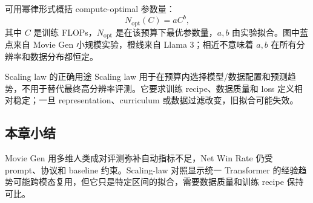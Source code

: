 
可用幂律形式概括 compute-optimal 参数量：
\[
N_{\mathrm{opt}}(C)=aC^b,
\]
其中 $C$ 是训练 FLOPs，$N_{\mathrm{opt}}$ 是在该预算下最优参数量，$a,b$ 由实验拟合。图中蓝点来自 Movie Gen 小规模实验，橙线来自 Llama 3；相近不意味着 $a,b$ 在所有分辨率和数据分布都恒定。

\begin{importantbox}{Scaling law 的正确用途}
Scaling law 用于在预算内选择模型/数据配置和预测趋势，不用于替代最终高分辨率评测。它要求训练 recipe、数据质量和 loss 定义相对稳定；一旦 representation、curriculum 或数据过滤改变，旧拟合可能失效。
\end{importantbox}


\subsection{本章小结}

Movie Gen 用多维人类成对评测弥补自动指标不足，Net Win Rate 仍受 prompt、协议和 baseline 约束。Scaling-law 对照显示统一 Transformer 的经验趋势可能跨模态复用，但它只是特定区间的拟合，需要数据质量和训练 recipe 保持可比。

